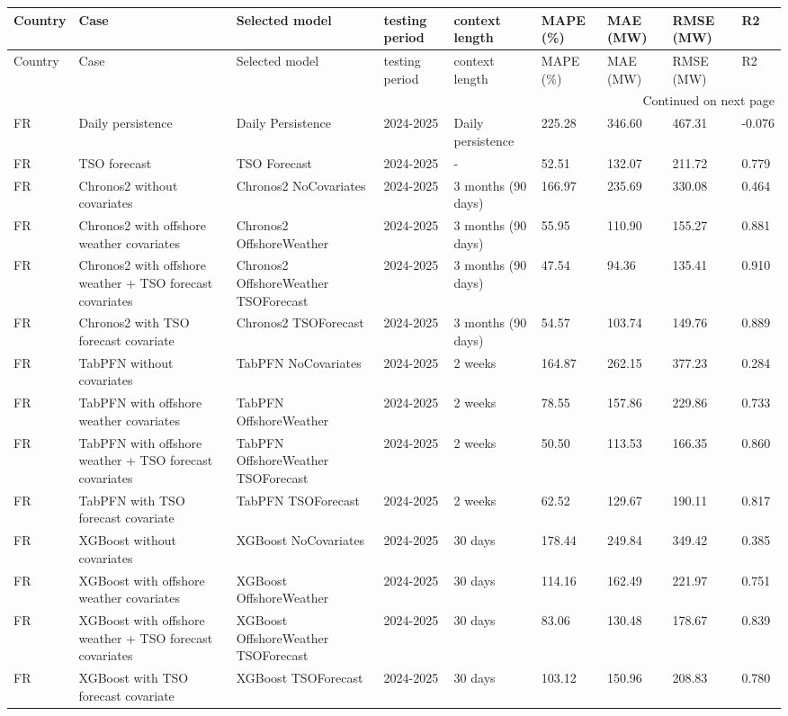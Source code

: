 \begin{longtable}{lllllllll}
\toprule
Country & Case & Selected model & testing period & context length & MAPE (\%) & MAE (MW) & RMSE (MW) & R2 \\
\midrule
\endfirsthead
\toprule
Country & Case & Selected model & testing period & context length & MAPE (\%) & MAE (MW) & RMSE (MW) & R2 \\
\midrule
\endhead
\midrule
\multicolumn{9}{r}{Continued on next page} \\
\midrule
\endfoot
\bottomrule
\endlastfoot
FR & Daily persistence & Daily Persistence & 2024-2025 & Daily persistence & 225.28 & 346.60 & 467.31 & -0.076 \\
FR & TSO forecast & TSO Forecast & 2024-2025 & - & 52.51 & 132.07 & 211.72 & 0.779 \\
FR & Chronos2 without covariates & Chronos2 NoCovariates & 2024-2025 & 3 months (90 days) & 166.97 & 235.69 & 330.08 & 0.464 \\
FR & Chronos2 with offshore weather covariates & Chronos2 OffshoreWeather & 2024-2025 & 3 months (90 days) & 55.95 & 110.90 & 155.27 & 0.881 \\
FR & Chronos2 with offshore weather + TSO forecast covariates & Chronos2 OffshoreWeather TSOForecast & 2024-2025 & 3 months (90 days) & 47.54 & 94.36 & 135.41 & 0.910 \\
FR & Chronos2 with TSO forecast covariate & Chronos2 TSOForecast & 2024-2025 & 3 months (90 days) & 54.57 & 103.74 & 149.76 & 0.889 \\
FR & TabPFN without covariates & TabPFN NoCovariates & 2024-2025 & 2 weeks & 164.87 & 262.15 & 377.23 & 0.284 \\
FR & TabPFN with offshore weather covariates & TabPFN OffshoreWeather & 2024-2025 & 2 weeks & 78.55 & 157.86 & 229.86 & 0.733 \\
FR & TabPFN with offshore weather + TSO forecast covariates & TabPFN OffshoreWeather TSOForecast & 2024-2025 & 2 weeks & 50.50 & 113.53 & 166.35 & 0.860 \\
FR & TabPFN with TSO forecast covariate & TabPFN TSOForecast & 2024-2025 & 2 weeks & 62.52 & 129.67 & 190.11 & 0.817 \\
FR & XGBoost without covariates & XGBoost NoCovariates & 2024-2025 & 30 days & 178.44 & 249.84 & 349.42 & 0.385 \\
FR & XGBoost with offshore weather covariates & XGBoost OffshoreWeather & 2024-2025 & 30 days & 114.16 & 162.49 & 221.97 & 0.751 \\
FR & XGBoost with offshore weather + TSO forecast covariates & XGBoost OffshoreWeather TSOForecast & 2024-2025 & 30 days & 83.06 & 130.48 & 178.67 & 0.839 \\
FR & XGBoost with TSO forecast covariate & XGBoost TSOForecast & 2024-2025 & 30 days & 103.12 & 150.96 & 208.83 & 0.780 \\
\end{longtable}
